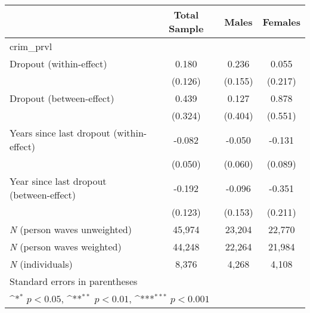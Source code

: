 {
\def\sym#1{\ifmmode^{#1}\else\(^{#1}\)\fi}
\begin{tabular}{l*{3}{c}}
\toprule
                    &\multicolumn{1}{c}{Total Sample}&\multicolumn{1}{c}{Males}&\multicolumn{1}{c}{Females}\\
\midrule
crim\_prvl           &                     &                     &                     \\
Dropout (within-effect)&       0.180         &       0.236         &       0.055         \\
                    &     (0.126)         &     (0.155)         &     (0.217)         \\
\addlinespace
Dropout (between-effect)&       0.439         &       0.127         &       0.878         \\
                    &     (0.324)         &     (0.404)         &     (0.551)         \\
\addlinespace
Years since last dropout (within-effect)&      -0.082         &      -0.050         &      -0.131         \\
                    &     (0.050)         &     (0.060)         &     (0.089)         \\
\addlinespace
Year since last dropout (between-effect)&      -0.192         &      -0.096         &      -0.351         \\
                    &     (0.123)         &     (0.153)         &     (0.211)         \\
\midrule
\textit{N} (person waves unweighted)&      45,974         &      23,204         &      22,770         \\
\textit{N} (person waves weighted)&      44,248         &      22,264         &      21,984         \\
\textit{N} (individuals)&       8,376         &       4,268         &       4,108         \\
\bottomrule
\multicolumn{4}{l}{\footnotesize Standard errors in parentheses}\\
\multicolumn{4}{l}{\footnotesize \sym{*} \(p<0.05\), \sym{**} \(p<0.01\), \sym{***} \(p<0.001\)}\\
\end{tabular}
}
